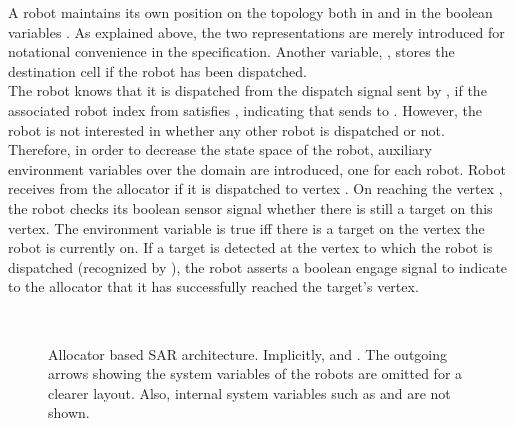 A robot  maintains its own position on the topology both in  and in the boolean variables . As explained above, the two representations are merely introduced for notational convenience in the specification. Another variable, , stores the destination cell if the robot has been dispatched.\\

The robot  knows that it is dispatched from the dispatch signal  sent by , if the associated robot index  from  satisfies , indicating that  sends  to . However, the robot is not interested in whether any other robot is dispatched or not. Therefore, in order to decrease the state space of the robot, auxiliary environment variables  over the domain  are introduced, one for each robot. Robot  receives  from the allocator if it is dispatched to vertex . On reaching the vertex , the robot checks its boolean sensor signal  whether there is still a target on this vertex. The environment variable  is true iff there is a target on the vertex the robot is currently on. If a target is detected at the vertex to which the robot is dispatched (recognized by ), the robot asserts a boolean engage signal  to indicate to the allocator that it has successfully reached the target's vertex.

\newcommand{\connE}[1]{\textstyle{E_{#1} = \sum_{j}(e_j \wedge X^j_{#1})}}
\newcommand{\connF}[1]{\textstyle{\flag_{#1} = \bigvee_{i} (X^{#1}_i \wedge f_i)}}\
\newcommand{\connD}[1]{\textstyle{d_{#1} = \begin{cases} D, &\text{if }R = {#1}\\ \e, &\text{otherwise}\end{cases}}}

\newcommand{\rinputF}{{f_i} \ar[l]}
\newcommand{\rinputD}{{} \ar[l]_<{D, R,}^<{f_i}}
\newcommand{\cinput}{{} \ar[r]^<{\cellID_j}_<{e_j}}

\newcommand{\cell}[1]{\cinput & *+[F]{\connE{#1}} \ar[r]^(0.7){E_{#1}} & *+++[o][F]{C_{#1}}}
\newcommand{\robotM}[2]{*+++[o][F]{R_{#1}} \ar@<.7pc>[r]^(.24){\cellID_{#1}} \ar[#2]_(.3){r_{#1}} & *+[F]{\begin{array}{l}\connD{#1} \\ \connF{#1}\end{array}} \ar@<.7pc>[l]^(.7){\flag_{#1}} & \rinputD }
\newcommand{\middleportion}{*++++[o][F]{\FIFOf} \ar@<1pc>[r]^{\DfA} \ar[r]^{F} & *++++[o][F]{\AMM} \ar@<1pc>[l]^{\Df} \ar[uu]^(0.3){D} & *++++[o][F]{\FIFOr} \ar[l]^{R}}

\begin{sidewaysfigure}

\caption{Allocator based SAR architecture. Implicitly,  and . The outgoing arrows showing the system variables  of the robots are omitted for a clearer layout. Also, internal system variables such as  and  are not shown.}
\label{fig:amm2}
\end{sidewaysfigure}


